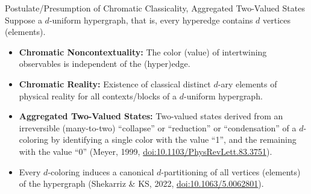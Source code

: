 \documentclass{beamer}
\begin{document}
\begin{frame}{Postulate/Presumption of Chromatic Classicality, Aggregated Two-Valued States}
\small
Suppose a $d$-uniform hypergraph, that is, every hyperedge contains $d$ vertices (elements).
\begin{itemize} [<+->] %
        \item \textbf{Chromatic Noncontextuality:} The color (value) of intertwining observables is independent of the (hyper)edge.
        \item \textbf{Chromatic Reality:} Existence of classical distinct $d$-ary elements of physical reality for all contexts/blocks
of a $d$-uniform hypergraph.
        \item \textbf{Aggregated Two-Valued States:} Two-valued states derived from an irreversible (many-to-two)
\alert{``collapse'' or ``reduction'' or ``condensation'' of a $d$-coloring} by identifying
a single color with the value ``1'', and the remaining with the value ``0''
(Meyer, 1999, \href{https://doi.org/10.1103/PhysRevLett.83.3751}{doi:10.1103/PhysRevLett.83.3751}).
 \item Every $d$-coloring induces a canonical $d$-partitioning of all vertices (elements) of the hypergraph
(Shekarriz \& KS, 2022, \href{https://doi.org/10.1063/5.0062801}{doi:10.1063/5.0062801}).
\end{itemize}
\end{frame}
\end{document}
